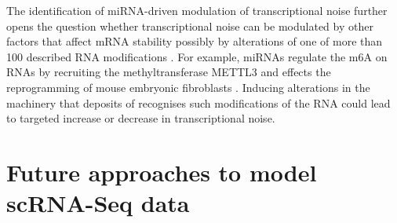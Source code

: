The identification of miRNA-driven modulation of transcriptional noise further opens the question whether transcriptional noise can be modulated by other factors that affect mRNA stability possibly by alterations of one of more than 100 described RNA modifications \citep{Cantara2011}. For example, miRNAs regulate the \gls{m6A} on RNAs by recruiting the methyltransferase METTL3 and effects the reprogramming of mouse embryonic fibroblasts \citep{Chen2015b}. Inducing alterations in the machinery that deposits of recognises such modifications of the RNA could lead to targeted increase or decrease in transcriptional noise.

\newpage

\section{Future approaches to model scRNA-Seq data}



